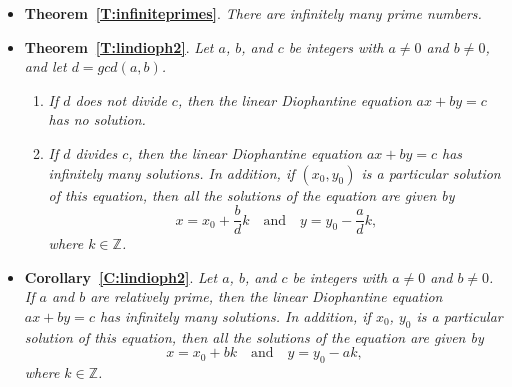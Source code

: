\begin{itemize}
\item \textbf{Theorem~\ref{T:infiniteprimes}}.
\emph{There are infinitely many prime numbers.}

\item \textbf{Theorem~\ref{T:lindioph2}}.
\emph{Let $a$, $b$, and $c$ be integers with $a \ne 0$ and $b \ne 0$, and let 
$d = gcd ( a,b )$.}

\begin{enumerate}
\item \emph{If $d$ does not divide $c$, then the linear Diophantine equation $ax + by = c$ has no solution.}

\item \emph{If $d$ divides $c$, then the linear Diophantine equation $ax + by = c$ has infinitely many solutions.  In addition, if  $( x_0, y_0 )$ is a particular solution of this equation, then all the solutions of the equation are given by
\[
x = x_0 + \frac{b}{d} k  \quad \text{and} \quad y = y_0 - \frac{a}{d} k,
\]
where $k \in \mathbb{Z}$.}
\end{enumerate}

\item \textbf{Corollary~\ref{C:lindioph2}}.
\emph{Let $a$, $b$, and $c$ be integers with $a \ne 0$ and $b \ne 0$.  If $a$ and $b$ are relatively prime, then the linear Diophantine equation $ax + by = c$ has infinitely many solutions.  In addition, if  $x_0$, $y_0$ is a particular solution of this equation, then all the solutions of the equation are given by
\[
x = x_0 + b k  \quad \text{and} \quad y = y_0 - a k,
\]
where $k \in \mathbb{Z}$.}



\end{itemize}
\hbreak

\endinput
